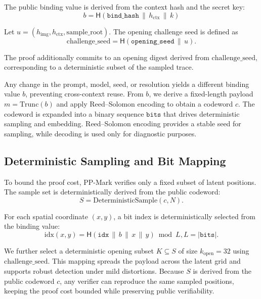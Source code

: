 \documentclass{article}
\theoremstyle{plain}
\theoremstyle{definition}
\theoremstyle{remark}
\begin{document}
The public binding value is derived from the context hash and the secret key:
\begin{equation}
b = \mathsf{H}(\texttt{bind\_hash} \,\|\, h_{\mathrm{ctx}} \,\|\, k)
\label{eq:binding_relation}
\end{equation}

Let \(u = (h_{\mathrm{img}}, h_{\mathrm{ctx}}, \mathrm{sample\_root})\). The opening challenge seed is defined as
\begin{equation}
\mathrm{challenge\_seed} = \mathsf{H}(\texttt{opening\_seed} \,\|\, u).
\end{equation}

The proof additionally commits to an opening digest derived from \(\mathrm{challenge\_seed}\), corresponding to a deterministic subset of the sampled trace.

Any change in the prompt, model, seed, or resolution yields a different binding value \(b\), preventing cross-context reuse. From \(b\), we derive a fixed-length payload \(m = \mathrm{Trunc}(b)\) and apply Reed--Solomon encoding to obtain a codeword \(c\). The codeword is expanded into a binary sequence \(\mathtt{bits}\) that drives deterministic sampling and embedding. Reed--Solomon encoding provides a stable seed for sampling, while decoding is used only for diagnostic purposes.

\subsection{Deterministic Sampling and Bit Mapping}
To bound the proof cost, PP-Mark verifies only a fixed subset of latent positions. The sample
set is deterministically derived from the public codeword:
\begin{equation}
S = \mathrm{DeterministicSample}(c, N).
\end{equation}

For each spatial coordinate \((x,y)\), a bit index is deterministically selected from the
binding value:
\begin{equation}
\mathrm{idx}(x,y) = \mathsf{H}(\texttt{idx} \,\|\, b \,\|\, x \,\|\, y) \bmod L,
 L = |\mathtt{bits}|.
\end{equation}

We further select a deterministic opening subset \(K \subseteq S\) of size
\(k_{\mathrm{open}} = 32\) using \(\mathrm{challenge\_seed}\). This mapping spreads the payload across the latent grid and supports robust detection under mild distortions. Because \(S\) is derived from the public codeword \(c\), any verifier can reproduce the same sampled positions, keeping the proof cost bounded while preserving public verifiability.
  
\end{document}
